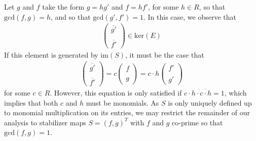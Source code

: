 \documentclass[aps,twocolumn,preprintnumbers,floatfix,showpacs,prx]{revtex4-1}
\begin{document}
Let $g$ and $f$ take the form $g = h g'$ and $f = h f'$, for some $h \in R$, so that $\mathrm{gcd}(f,g) = h$, and so that $\mathrm{gcd}(g',f') = 1$. In this case, we observe that 
\begin{align}
\left(\begin{array}{c}\overline{g'}\\\\\overline{f'}\end{array}\right) \in \mathrm{ker}(E)
\end{align}
If this element is generated by $\mathrm{im}(S)$, it must be the case that 
\begin{align}
\left(\begin{array}{c}\overline{g'}\\\\\overline{f'}\end{array}\right) = c\left(\begin{array}{c}{f}\\\\{g}\end{array}\right) = c\cdot h\left(\begin{array}{c}{f'}\\\\{g'}\end{array}\right)
\end{align}
for some $c\in R$.  However, this equation is only satisfied if $c \cdot h\cdot\overline{c\cdot h} = 1$, which implies that both $c$ and $h$ must be monomials. As $S$ is only uniquely defined up to monomial multiplication on its entries, we may restrict the remainder of our analysis to stabilizer maps $S = (f, g)^{T}$ with $f$ and $g$ co-prime so that $\mathrm{gcd}(f,g) = 1$.

\end{document}
